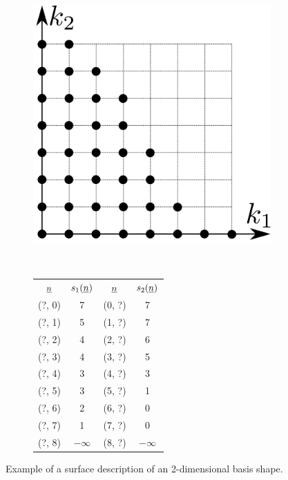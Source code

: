\documentclass{article}
\begin{document}
\begin{figure}[H]
  \centering
  \begin{subfigure}[]{0.4\textwidth}
    \includegraphics[width=1.0\textwidth]{shape_example}
    \label{fig:shape_example}
  \end{subfigure}
  ~
  \begin{subfigure}[]{0.5\textwidth}
    \begin{tabular}{|| c | c || c | c ||}
      \(\underline{n}\) & \(s_1(\underline{n})\) & \(\underline{n}\) & \(s_2(\underline{n})\) \\
      (?, 0) & 7 & (0, ?) & 7 \\
      (?, 1) & 5 & (1, ?) & 7 \\
      (?, 2) & 4 & (2, ?) & 6 \\
      (?, 3) & 4 & (3, ?) & 5 \\
      (?, 4) & 3 & (4, ?) & 3 \\
      (?, 5) & 3 & (5, ?) & 1 \\
      (?, 6) & 2 & (6, ?) & 0 \\
      (?, 7) & 1 & (7, ?) & 0 \\
      (?, 8) & \(-\infty\) & (8, ?) & \(-\infty\) \\
    \end{tabular}
  \end{subfigure}
  \caption{Example of a surface description of an 2-dimensional basis shape.}
\end{figure}
\end{document}
